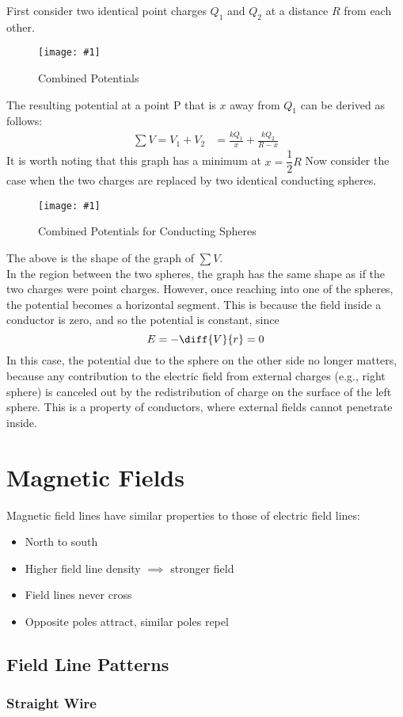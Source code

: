 \documentclass[a4paper,12pt]{article}
\let\oldsection\section
\renewcommand\section{\clearpage\oldsection}
\newcommand{\lb}{\\[8pt]}
\newcommand{\img}[4]{\begin{center}
  \begin{figure}[H]
    \centering
    \texttt{[image: \#1]}
    \caption{#3}
    \label{fig:#4}
  \end{figure}
\end{center}}
\begin{document}
First consider two identical point charges $Q_1$ and $Q_2$ at a distance $R$ from each other.
\img{combined.png}{0.9}{Combined Potentials}{combined}
The resulting potential at a point P that is $x$ away from $Q_1$ can be derived as follows:
\begin{align*}
  \sum V = V_1 + V_2 & = \frac{kQ_1}{x} + \frac{kQ_2}{R - x}
\end{align*}
It is worth noting that this graph has a minimum at $x = \dfrac{1}{2} R$
Now consider the case when the two charges are replaced by two identical conducting spheres.
\img{combinedhollow.png}{0.9}{Combined Potentials for Conducting Spheres}{combinedhollow}
The above is the shape of the graph of $\sum V$.\lb
In the region between the two spheres, the graph has the same shape as if the two charges were point charges. However, once reaching into one of the spheres, the potential becomes a horizontal segment. This is because the field inside a conductor is zero, and so the potential is constant, since $$E = -\diff{V}{r} = 0$$
In this case, the potential due to the sphere on the other side no longer matters, because any contribution to the electric field from external charges (e.g., right sphere) is canceled out by the redistribution of charge on the surface of the left sphere. This is a property of conductors, where external fields cannot penetrate inside.

\section{Magnetic Fields}

Magnetic field lines have similar properties to those of electric field lines:
\begin{itemize}
  \item North to south
  \item Higher field line density $\implies$ stronger field
  \item Field lines never cross
  \item Opposite poles attract, similar poles repel
\end{itemize}

\subsection{Field Line Patterns}

\subsubsection{Straight Wire}
\end{document}
